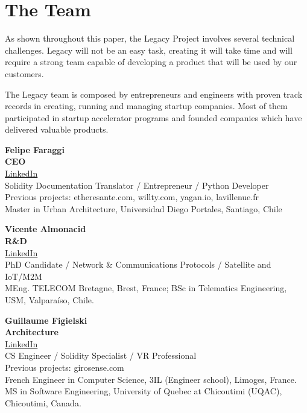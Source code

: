 \chapter{The Team} %
\label{cha:the_team}

As shown throughout this paper, the Legacy Project involves several technical challenges. 
Legacy will not be an easy task, creating it will take time and will require a strong team capable of developing a product that will be used by our customers.

The Legacy team is composed by entrepreneurs and engineers with proven track records in creating, running and managing startup companies. Most of them participated in startup accelerator programs and founded companies which have delivered valuable products.

\vspace{5mm} 
 
\noindent
\textbf{Felipe Faraggi} \\
\textbf{CEO} \\
\href{https://www.linkedin.com/in/faraggi}{LinkedIn}\\
Solidity Documentation Translator / Entrepreneur / Python Developer \\
Previous projects: etheresante.com, willty.com, yagan.io, lavillenue.fr \\
Master in Urban Architecture, Universidad Diego Portales, Santiago, Chile

\vspace{5mm} %
 
\noindent
\textbf{Vicente Almonacid} \\
\textbf{R\&D} \\
\href{https://www.linkedin.com/in/vicente-almonacid}{LinkedIn} \\ 
PhD Candidate / Network \& Communications Protocols / Satellite and IoT/M2M \\
MEng. TELECOM Bretagne, Brest, France; BSc in Telematics Engineering, USM, Valparaíso, Chile.

\vspace{5mm} %
 
\noindent
\textbf{Guillaume Figielski} \\
\textbf{Architecture} \\
\href{https://www.linkedin.com/in/guillaume-figielski-139922b2/}{LinkedIn} \\ 
CS Engineer / Solidity Specialist / VR Professional \\
Previous projects: girosense.com \\
French Engineer in Computer Science, 3IL (Engineer school), Limoges, France. \\
MS in Software Engineering, University of Quebec at Chicoutimi (UQAC), Chicoutimi, Canada. \\

